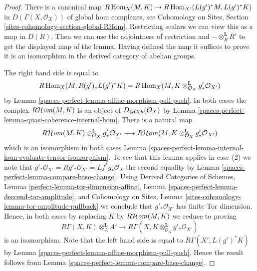 \begin{proof}
There is a canonical map
$R\operatorname{Hom}_X(M, K) \to R\operatorname{Hom}_{X'}(L(g')^*M, L(g')^*K)$
in $D(\Gamma(X, \mathcal{O}_X))$ of global hom complexes, see
Cohomology on Sites, Section \ref{sites-cohomology-section-global-RHom}.
Restricting scalars we can view this as a map in $D(R)$.
Then we can use the adjointness of restriction and
$- \otimes_R^\mathbf{L} R'$ to get the displayed map of the lemma.
Having defined the map it suffices to prove it is an isomorphism
in the derived category of abelian groups.

\medskip\noindent
The right hand side is equal to
$$
R\operatorname{Hom}_X(M, R(g')_*L(g')^*K) =
R\operatorname{Hom}_X(M, K \otimes_{\mathcal{O}_X}^\mathbf{L} g'_*\mathcal{O}_{X'})
$$
by Lemma \ref{spaces-perfect-lemma-affine-morphism-pull-push}. In both cases the complex
$R\mathcal{H}\mathit{om}(M, K)$ is an object of $D_{\mathit{QCoh}}(\mathcal{O}_X)$ by
Lemma \ref{spaces-perfect-lemma-quasi-coherence-internal-hom}. There is a natural map
$$
R\mathcal{H}\mathit{om}(M, K) \otimes_{\mathcal{O}_X}^\mathbf{L} g'_*\mathcal{O}_{X'}
\longrightarrow
R\mathcal{H}\mathit{om}(M, K \otimes_{\mathcal{O}_X}^\mathbf{L} g'_*\mathcal{O}_{X'})
$$
which is an isomorphism in both cases
Lemma \ref{spaces-perfect-lemma-internal-hom-evaluate-tensor-isomorphism}.
To see that this lemma applies in case (2) we note that
$g'_*\mathcal{O}_{X'} = Rg'_*\mathcal{O}_{X'} =
Lf^*g_*\mathcal{O}_X$ the second equality by
Lemma \ref{spaces-perfect-lemma-compare-base-change}.
Using Derived Categories of Schemes, Lemma
\ref{perfect-lemma-tor-dimension-affine},
Lemma \ref{spaces-perfect-lemma-descend-tor-amplitude}, and
Cohomology on Sites, Lemma \ref{sites-cohomology-lemma-tor-amplitude-pullback}
we conclude that $g'_*\mathcal{O}_{X'}$ has finite Tor dimension.
Hence, in both cases by replacing $K$ by $R\mathcal{H}\mathit{om}(M, K)$ we reduce
to proving
$$
R\Gamma(X, K) \otimes^\mathbf{L}_A A' \longrightarrow
R\Gamma(X, K \otimes^\mathbf{L}_{\mathcal{O}_X} g'_*\mathcal{O}_{X'})
$$
is an isomorphism.
Note that the left hand side is equal to $R\Gamma(X', L(g')^*K)$
by Lemma \ref{spaces-perfect-lemma-affine-morphism-pull-push}.
Hence the result follows from
Lemma \ref{spaces-perfect-lemma-compare-base-change}.
\end{proof}

